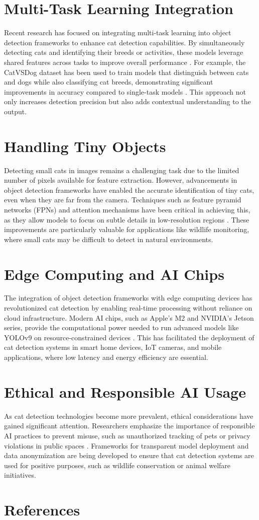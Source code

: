 \section{Multi-Task Learning Integration}  
Recent research has focused on integrating multi-task learning into object detection frameworks to enhance cat detection capabilities. By simultaneously detecting cats and identifying their breeds or activities, these models leverage shared features across tasks to improve overall performance \cite{MultiTaskLearning}. For example, the CatVSDog dataset has been used to train models that distinguish between cats and dogs while also classifying cat breeds, demonstrating significant improvements in accuracy compared to single-task models \cite{CatVSDog}. This approach not only increases detection precision but also adds contextual understanding to the output.  

\section{Handling Tiny Objects}  
Detecting small cats in images remains a challenging task due to the limited number of pixels available for feature extraction. However, advancements in object detection frameworks have enabled the accurate identification of tiny cats, even when they are far from the camera. Techniques such as feature pyramid networks (FPNs) and attention mechanisms have been critical in achieving this, as they allow models to focus on subtle details in low-resolution regions \cite{TinyObjectDetection}. These improvements are particularly valuable for applications like wildlife monitoring, where small cats may be difficult to detect in natural environments.  

\section{Edge Computing and AI Chips}  
The integration of object detection frameworks with edge computing devices has revolutionized cat detection by enabling real-time processing without reliance on cloud infrastructure. Modern AI chips, such as Apple's M2 and NVIDIA's Jetson series, provide the computational power needed to run advanced models like YOLOv9 on resource-constrained devices \cite{EdgeComputing}. This has facilitated the deployment of cat detection systems in smart home devices, IoT cameras, and mobile applications, where low latency and energy efficiency are essential.  

\section{Ethical and Responsible AI Usage}  
As cat detection technologies become more prevalent, ethical considerations have gained significant attention. Researchers emphasize the importance of responsible AI practices to prevent misuse, such as unauthorized tracking of pets or privacy violations in public spaces \cite{EthicalAI}. Frameworks for transparent model deployment and data anonymization are being developed to ensure that cat detection systems are used for positive purposes, such as wildlife conservation or animal welfare initiatives.  

\section{References}  
  
  
  